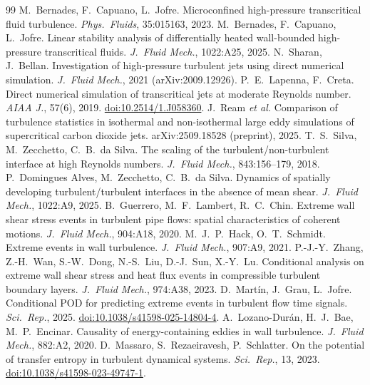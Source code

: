 \documentclass[11pt]{article}
\begin{document}
\begin{thebibliography}{99}
 M.\ Bernades, F.\ Capuano, L.\ Jofre. Microconfined high-pressure transcritical fluid turbulence. \emph{Phys.\ Fluids}, 35:015163, 2023.
 M.\ Bernades, F.\ Capuano, L.\ Jofre. Linear stability analysis of differentially heated wall-bounded high-pressure transcritical fluids. \emph{J.\ Fluid Mech.}, 1022:A25, 2025.
 N.\ Sharan, J.\ Bellan. Investigation of high-pressure turbulent jets using direct numerical simulation. \emph{J.\ Fluid Mech.}, 2021 (arXiv:2009.12926).
 P.\ E.\ Lapenna, F.\ Creta. Direct numerical simulation of transcritical jets at moderate Reynolds number. \emph{AIAA J.}, 57(6), 2019. \href{https://doi.org/10.2514/1.J058360}{doi:10.2514/1.J058360}.
 J.\ Ream \emph{et al.} Comparison of turbulence statistics in isothermal and non-isothermal large eddy simulations of supercritical carbon dioxide jets. arXiv:2509.18528 (preprint), 2025.
 T.\ S.\ Silva, M.\ Zecchetto, C.\ B.\ da Silva. The scaling of the turbulent/non-turbulent interface at high Reynolds numbers. \emph{J.\ Fluid Mech.}, 843:156--179, 2018.
 P.\ Domingues Alves, M.\ Zecchetto, C.\ B.\ da Silva. Dynamics of spatially developing turbulent/turbulent interfaces in the absence of mean shear. \emph{J.\ Fluid Mech.}, 1022:A9, 2025.
 B.\ Guerrero, M.\ F.\ Lambert, R.\ C.\ Chin. Extreme wall shear stress events in turbulent pipe flows: spatial characteristics of coherent motions. \emph{J.\ Fluid Mech.}, 904:A18, 2020.
 M.\ J.\ P.\ Hack, O.\ T.\ Schmidt. Extreme events in wall turbulence. \emph{J.\ Fluid Mech.}, 907:A9, 2021.
 P.-J.-Y.\ Zhang, Z.-H.\ Wan, S.-W.\ Dong, N.-S.\ Liu, D.-J.\ Sun, X.-Y.\ Lu. Conditional analysis on extreme wall shear stress and heat flux events in compressible turbulent boundary layers. \emph{J.\ Fluid Mech.}, 974:A38, 2023.
 D.\ Mart\'in, J.\ Grau, L.\ Jofre. Conditional POD for predicting extreme events in turbulent flow time signals. \emph{Sci.\ Rep.}, 2025. \href{https://doi.org/10.1038/s41598-025-14804-4}{doi:10.1038/s41598-025-14804-4}.
 A.\ Lozano-Dur\'an, H.\ J.\ Bae, M.\ P.\ Encinar. Causality of energy-containing eddies in wall turbulence. \emph{J.\ Fluid Mech.}, 882:A2, 2020.
 D.\ Massaro, S.\ Rezaeiravesh, P.\ Schlatter. On the potential of transfer entropy in turbulent dynamical systems. \emph{Sci.\ Rep.}, 13, 2023. \href{https://doi.org/10.1038/s41598-023-49747-1}{doi:10.1038/s41598-023-49747-1}.

\end{thebibliography}
\end{document}
